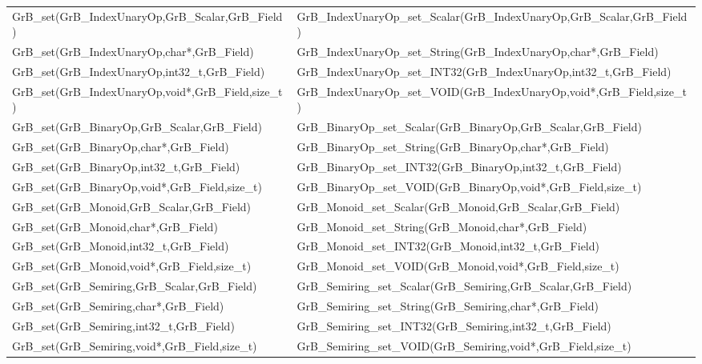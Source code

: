 \begin{table}[htb]
{\begin{tabular}{l|l}
{\sf GrB\_set(GrB\_IndexUnaryOp,GrB\_Scalar,GrB\_Field)}  & {\sf GrB\_IndexUnaryOp\_set\_Scalar(GrB\_IndexUnaryOp,GrB\_Scalar,GrB\_Field)} \\
{\sf GrB\_set(GrB\_IndexUnaryOp,char*,GrB\_Field)}        & {\sf GrB\_IndexUnaryOp\_set\_String(GrB\_IndexUnaryOp,char*,GrB\_Field)}       \\
{\sf GrB\_set(GrB\_IndexUnaryOp,int32\_t,GrB\_Field)}       & {\sf GrB\_IndexUnaryOp\_set\_INT32(GrB\_IndexUnaryOp,int32\_t,GrB\_Field)}    \\
{\sf GrB\_set(GrB\_IndexUnaryOp,void*,GrB\_Field,size\_t)}      & {\sf GrB\_IndexUnaryOp\_set\_VOID(GrB\_IndexUnaryOp,void*,GrB\_Field,size\_t)}   \\
\hline

{\sf GrB\_set(GrB\_BinaryOp,GrB\_Scalar,GrB\_Field)}  & {\sf GrB\_BinaryOp\_set\_Scalar(GrB\_BinaryOp,GrB\_Scalar,GrB\_Field)} \\
{\sf GrB\_set(GrB\_BinaryOp,char*,GrB\_Field)}        & {\sf GrB\_BinaryOp\_set\_String(GrB\_BinaryOp,char*,GrB\_Field)}       \\
{\sf GrB\_set(GrB\_BinaryOp,int32\_t,GrB\_Field)}       & {\sf GrB\_BinaryOp\_set\_INT32(GrB\_BinaryOp,int32\_t,GrB\_Field)}    \\
{\sf GrB\_set(GrB\_BinaryOp,void*,GrB\_Field,size\_t)}      & {\sf GrB\_BinaryOp\_set\_VOID(GrB\_BinaryOp,void*,GrB\_Field,size\_t)}   \\
\hline

{\sf GrB\_set(GrB\_Monoid,GrB\_Scalar,GrB\_Field)}  & {\sf GrB\_Monoid\_set\_Scalar(GrB\_Monoid,GrB\_Scalar,GrB\_Field)} \\
{\sf GrB\_set(GrB\_Monoid,char*,GrB\_Field)}        & {\sf GrB\_Monoid\_set\_String(GrB\_Monoid,char*,GrB\_Field)}       \\
{\sf GrB\_set(GrB\_Monoid,int32\_t,GrB\_Field)}       & {\sf GrB\_Monoid\_set\_INT32(GrB\_Monoid,int32\_t,GrB\_Field)}    \\
{\sf GrB\_set(GrB\_Monoid,void*,GrB\_Field,size\_t)}      & {\sf GrB\_Monoid\_set\_VOID(GrB\_Monoid,void*,GrB\_Field,size\_t)}   \\
\hline

{\sf GrB\_set(GrB\_Semiring,GrB\_Scalar,GrB\_Field)}  & {\sf GrB\_Semiring\_set\_Scalar(GrB\_Semiring,GrB\_Scalar,GrB\_Field)} \\
{\sf GrB\_set(GrB\_Semiring,char*,GrB\_Field)}        & {\sf GrB\_Semiring\_set\_String(GrB\_Semiring,char*,GrB\_Field)}       \\
{\sf GrB\_set(GrB\_Semiring,int32\_t,GrB\_Field)}       & {\sf GrB\_Semiring\_set\_INT32(GrB\_Semiring,int32\_t,GrB\_Field)}    \\
{\sf GrB\_set(GrB\_Semiring,void*,GrB\_Field,size\_t)}      & {\sf GrB\_Semiring\_set\_VOID(GrB\_Semiring,void*,GrB\_Field,size\_t)}   \\
\hline


\end{tabular}}
\end{table}
